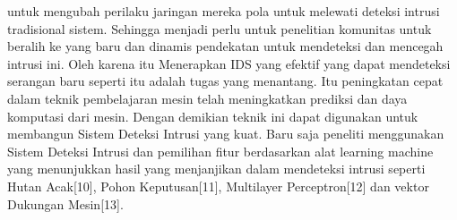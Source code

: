 \documentclass[conference]{IEEEtran}
\begin{document}
untuk mengubah perilaku jaringan mereka pola untuk melewati deteksi intrusi tradisional sistem. Sehingga menjadi perlu untuk penelitian komunitas untuk beralih ke yang baru dan dinamis pendekatan untuk mendeteksi dan mencegah intrusi ini. Oleh karena itu Menerapkan IDS yang efektif yang dapat mendeteksi serangan baru seperti itu adalah tugas yang menantang. Itu peningkatan cepat dalam teknik pembelajaran mesin telah meningkatkan prediksi dan daya komputasi dari mesin. Dengan demikian teknik ini dapat digunakan untuk membangun Sistem Deteksi Intrusi yang kuat. Baru saja peneliti menggunakan Sistem Deteksi Intrusi dan pemilihan fitur berdasarkan alat learning machine yang menunjukkan hasil yang menjanjikan dalam mendeteksi intrusi seperti Hutan Acak[10]\cite{ambikavathi2020predictor}, Pohon Keputusan[11]\cite{sarker2020intrudtree}, Multilayer Perceptron[12]\cite{moukhafi2020intelligent} dan vektor Dukungan Mesin[13]\cite{safaldin2021improved}.
\end{document}

